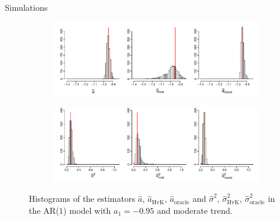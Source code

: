 \documentclass[10pt]{beamer}
\begin{document}
\begin{frame}{Simulations}


\begin{figure}[t!]
\centering
\begin{subfigure}[b]{0.8\textwidth}
\includegraphics[width=\textwidth]{a_hat_histograms_a1=-95_T=500_slope=1_(q,r,M1,M2)=(25,10,20,30).pdf}
\end{subfigure}
\begin{subfigure}[b]{0.8\textwidth}
\includegraphics[width=\textwidth]{lrv_histograms_a1=-95_T=500_slope=1_(q,r,M1,M2)=(25,10,20,30).pdf}
\end{subfigure}
\caption{Histograms of the estimators $\widehat{a}$, $\widehat{a}_{\text{HvK}}$, $\widehat{a}_{\text{oracle}}$ and $\widehat{\sigma}^2$, $\widehat{\sigma}^2_{\text{HvK}}$, $\widehat{\sigma}^2_{\text{oracle}}$ in the AR($1$) model with $a_1 = -0.95$ and moderate trend.}\label{fig:hist_scenario1} 
\end{figure}
\end{frame}
\end{document}
